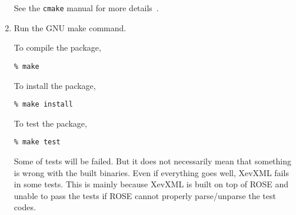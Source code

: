 \begin{enumerate}
       See the \texttt{cmake} manual for more details~\cite{cmake}.

 \item Run the GNU make command.

   To compile the package,

       \vspace{5mm}
       \texttt{\% make}
       \vspace{5mm}

   To install the package,

       \vspace{5mm}
       \texttt{\% make install}
       \vspace{5mm}

   To test the package,

       \vspace{5mm}
       \texttt{\% make test}
       \vspace{5mm}

       Some of tests will be failed. But it does not necessarily mean
       that something is wrong with the built binaries. Even if
       everything goes well, XevXML fails in some tests. This is mainly
       because XevXML is built on top of ROSE and unable to pass the
       tests if ROSE cannot properly parse/unparse the test codes.

\end{enumerate}
